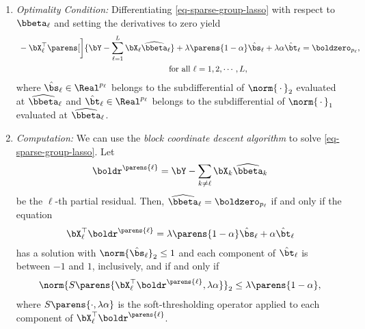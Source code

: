\documentclass[12pt]{article}
\begin{document}
\begin{enumerate}[label=\textbf{\arabic*.}]
\begin{enumerate}
		\item \textit{Optimality Condition:} Differentiating \eqref{eq-sparse-group-lasso} with respect to $\bbeta_{\ell}$ and setting the derivatives to zero yield 
		\begin{equation}
			\begin{aligned}
				& \, - \bX_{\ell}^\top \parens[\bigg]{\bY - \sum_{\ell=1}^L \bX_{\ell} \widehat{\bbeta}_{\ell}} + \lambda \parens{1 - \alpha} \hat{\bs}_{\ell} + \lambda \alpha \hat{\bt}_{\ell} = \boldzero_{p_{\ell}}, \\ 
				& \qquad \qquad \qquad \qquad \qquad \qquad \qquad \qquad \qquad \text{ for all } \ell = 1, 2, \cdots, L, 
			\end{aligned}
		\end{equation}
		where $\hat{\bs}_{\ell} \in \Real^{p_{\ell}}$ belongs to the subdifferential of $\norm{\,\cdot\,}_2$ evaluated at $\widehat{\bbeta}_{\ell}$ and $\hat{\bt}_{\ell} \in \Real^{p_{\ell}}$ belongs to the subdifferential of $\norm{\,\cdot\,}_1$ evaluated at $\widehat{\bbeta}_{\ell}$. 
		
		\item \textit{Computation:} We can use the \emph{block coordinate descent algorithm} to solve \eqref{eq-sparse-group-lasso}. %
		Let 
		\begin{align*}
			\boldr^{\parens{\ell}} = \bY - \sum_{k \neq \ell} \bX_{k} \widehat{\bbeta}_{k}
		\end{align*}
		be the $\ell$-th partial residual. Then, $\widehat{\bbeta}_{\ell} = \boldzero_{p_{\ell}}$ if and only if the equation 
		\begin{align*}
			\bX_{\ell}^\top \boldr^{\parens{\ell}} = \lambda \parens{1 - \alpha} \hat{\bs}_{\ell} + \alpha \hat{\bt}_{\ell}
		\end{align*}
		has a solution with $\norm{\hat{\bs}_{\ell}}_2 \le 1$ and each component of $\hat{\bt}_{\ell}$ is between $-1$ and $1$, inclusively, and if and only if 
		\begin{align*}
			\norm{S \parens{\bX_{\ell}^\top \boldr^{\parens{\ell}}, \lambda \alpha}}_2 \le \lambda \parens{1 - \alpha}, 
		\end{align*}
		where $S \parens{\cdot, \lambda \alpha}$ is the soft-thresholding operator applied to each component of $\bX_{\ell}^\top \boldr^{\parens{\ell}}$. 
		

\end{enumerate}
\end{enumerate}
\end{document}
